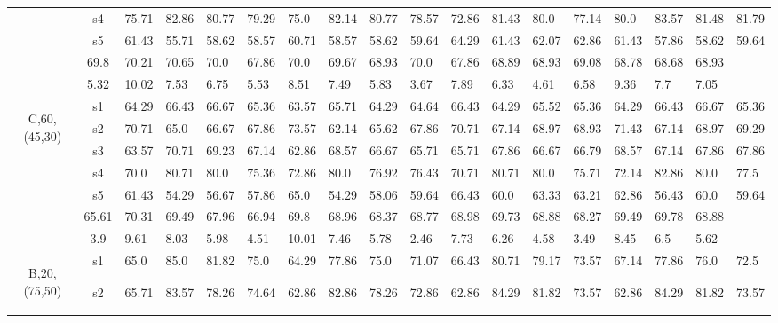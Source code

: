 \begin{table}[h]
{\begin{tabular}{cc|llll|llll|llll|llll}
 & s4 & 75.71 & 82.86 & 80.77 & 79.29 & 75.0 & 82.14 & 80.77 & 78.57 & 72.86 & 81.43 & 80.0 & 77.14 & 80.0 & 83.57 & 81.48 & 81.79 \\
 & s5 & 61.43 & 55.71 & 58.62 & 58.57 & 60.71 & 58.57 & 58.62 & 59.64 & 64.29 & 61.43 & 62.07 & 62.86 & 61.43 & 57.86 & 58.62 & 59.64 \\
\rowcolor{lightgray!50}\multicolumn{2}{r|}{avg} & 69.8 & 70.21 & 70.65 & 70.0 & 67.86 & 70.0 & 69.67 & 68.93 & 70.0 & 67.86 & 68.89 & 68.93 & 69.08 & 68.78 & 68.68 & 68.93 \\
\rowcolor{lightgray!50}\multicolumn{2}{r|}{std} & 5.32 & 10.02 & 7.53 & 6.75 & 5.53 & 8.51 & 7.49 & 5.83 & 3.67 & 7.89 & 6.33 & 4.61 & 6.58 & 9.36 & 7.7 & 7.05 \\
\multirow{6}{*}{\begin{sideways}C,60,(45,30)\end{sideways}} & s1 & 64.29 & 66.43 & 66.67 & 65.36 & 63.57 & 65.71 & 64.29 & 64.64 & 66.43 & 64.29 & 65.52 & 65.36 & 64.29 & 66.43 & 66.67 & 65.36 \\
 & s2 & 70.71 & 65.0 & 66.67 & 67.86 & 73.57 & 62.14 & 65.62 & 67.86 & 70.71 & 67.14 & 68.97 & 68.93 & 71.43 & 67.14 & 68.97 & 69.29 \\
 & s3 & 63.57 & 70.71 & 69.23 & 67.14 & 62.86 & 68.57 & 66.67 & 65.71 & 65.71 & 67.86 & 66.67 & 66.79 & 68.57 & 67.14 & 67.86 & 67.86 \\
 & s4 & 70.0 & 80.71 & 80.0 & 75.36 & 72.86 & 80.0 & 76.92 & 76.43 & 70.71 & 80.71 & 80.0 & 75.71 & 72.14 & 82.86 & 80.0 & 77.5 \\
 & s5 & 61.43 & 54.29 & 56.67 & 57.86 & 65.0 & 54.29 & 58.06 & 59.64 & 66.43 & 60.0 & 63.33 & 63.21 & 62.86 & 56.43 & 60.0 & 59.64 \\
\rowcolor{lightgray!50}\multicolumn{2}{r|}{avg} & 65.61 & 70.31 & 69.49 & 67.96 & 66.94 & 69.8 & 68.96 & 68.37 & 68.77 & 68.98 & 69.73 & 68.88 & 68.27 & 69.49 & 69.78 & 68.88 \\
\rowcolor{lightgray!50}\multicolumn{2}{r|}{std} & 3.9 & 9.61 & 8.03 & 5.98 & 4.51 & 10.01 & 7.46 & 5.78 & 2.46 & 7.73 & 6.26 & 4.58 & 3.49 & 8.45 & 6.5 & 5.62 \\
\multirow{6}{*}{\begin{sideways}B,20,(75,50)\end{sideways}} & s1 & 65.0 & 85.0 & 81.82 & 75.0 & 64.29 & 77.86 & 75.0 & 71.07 & 66.43 & 80.71 & 79.17 & 73.57 & 67.14 & 77.86 & 76.0 & 72.5 \\
 & s2 & 65.71 & 83.57 & 78.26 & 74.64 & 62.86 & 82.86 & 78.26 & 72.86 & 62.86 & 84.29 & 81.82 & 73.57 & 62.86 & 84.29 & 81.82 & 73.57 \\

\end{tabular}}
\end{table}
